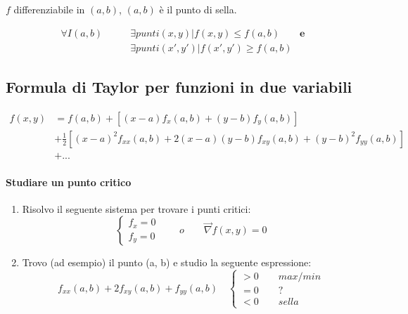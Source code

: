 \documentclass[10pt,a4paper,fleqn]{article}
\begin{document}
	$f$ differenziabile in $(a, b)$, $(a, b)$ è il punto di sella.
	
	\begin{equation}
	\begin{split}
	\forall I(a, b) \qquad &\exists punti (x, y) | f(x, y) \leq f(a, b)\qquad \mathbf{e}\\
	&\exists punti (x', y') | f(x', y') \geq f(a, b)
	\end{split}
	\end{equation}
	
	\subsection{Formula di Taylor per funzioni in due variabili}

	\begin{equation}
	\begin{split}
	f(x, y) &= f(a, b) + \left[(x-a)f_x(a, b) + (y-b)f_y(a, b) \right]\\ &+ \frac{1}{2}\left[(x-a)^2 f_{xx}(a, b) + 2(x-a)(y-b)f_{xy}(a, b) + (y-b)^2 f_{yy}(a, b)\right]\\ &+ ...
	\end{split}
	\end{equation}
	\paragraph{Studiare un punto critico}
	\begin{enumerate}
	\item Risolvo il seguente sistema per trovare i punti critici:
		\begin{equation}
			\begin{cases}
			f_x=0 \\ f_y=0
			\end{cases}
			\qquad o \qquad \vec{\nabla}f(x,y)=0
		\end{equation}
	\item Trovo (ad esempio) il punto (a, b) e studio la seguente espressione:
	\begin{equation}
	f_{xx}(a,b) + 2f_{xy}(a,b) + f_{yy}(a,b) \quad
	\begin{cases}
	> 0 \qquad \textit{max/min} \\ = 0 \qquad ? \\ < 0 \qquad \textit{sella}
	\end{cases}
	\end{equation}
	\end{enumerate}
\end{document}
